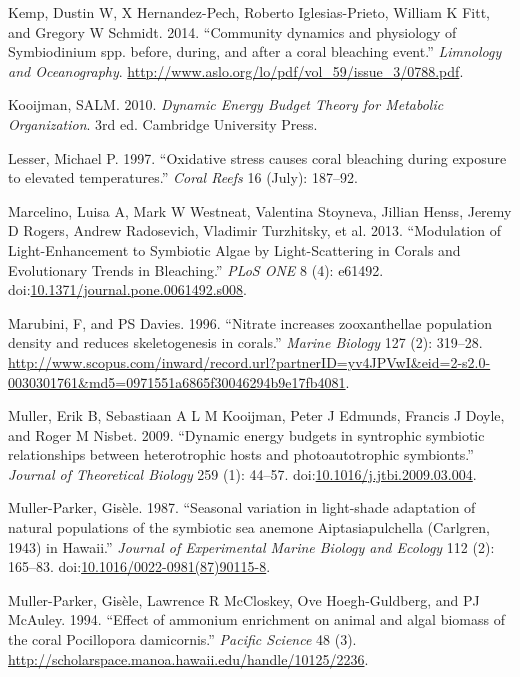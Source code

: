 \documentclass[]{elsarticle} %
\begin{document}
\hypertarget{ref-Kemp:2014ug}{}
Kemp, Dustin W, X Hernandez-Pech, Roberto Iglesias-Prieto, William K
Fitt, and Gregory W Schmidt. 2014. ``Community dynamics and physiology
of Symbiodinium spp. before, during, and after a coral bleaching
event.'' \emph{Limnology and Oceanography}.
\url{http://www.aslo.org/lo/pdf/vol_59/issue_3/0788.pdf}.

\hypertarget{ref-Kooijman:2010vd}{}
Kooijman, SALM. 2010. \emph{Dynamic Energy Budget Theory for Metabolic
Organization}. 3rd ed. Cambridge University Press.

\hypertarget{ref-Lesser:1997p3587}{}
Lesser, Michael P. 1997. ``Oxidative stress causes coral bleaching
during exposure to elevated temperatures.'' \emph{Coral Reefs} 16
(July): 187--92.

\hypertarget{ref-Marcelino:2013hz}{}
Marcelino, Luisa A, Mark W Westneat, Valentina Stoyneva, Jillian Henss,
Jeremy D Rogers, Andrew Radosevich, Vladimir Turzhitsky, et al. 2013.
``Modulation of Light-Enhancement to Symbiotic Algae by Light-Scattering
in Corals and Evolutionary Trends in Bleaching.'' \emph{PLoS ONE} 8 (4):
e61492.
doi:\href{https://doi.org/10.1371/journal.pone.0061492.s008}{10.1371/journal.pone.0061492.s008}.

\hypertarget{ref-Marubini:1996p8460}{}
Marubini, F, and PS Davies. 1996. ``Nitrate increases zooxanthellae
population density and reduces skeletogenesis in corals.'' \emph{Marine
Biology} 127 (2): 319--28.
\url{http://www.scopus.com/inward/record.url?partnerID=yv4JPVwI\&eid=2-s2.0-0030301761\&md5=0971551a6865f30046294b9e17fb4081}.

\hypertarget{ref-Muller:2009io}{}
Muller, Erik B, Sebastiaan A L M Kooijman, Peter J Edmunds, Francis J
Doyle, and Roger M Nisbet. 2009. ``Dynamic energy budgets in syntrophic
symbiotic relationships between heterotrophic hosts and photoautotrophic
symbionts.'' \emph{Journal of Theoretical Biology} 259 (1): 44--57.
doi:\href{https://doi.org/10.1016/j.jtbi.2009.03.004}{10.1016/j.jtbi.2009.03.004}.

\hypertarget{ref-MullerParker:1987cr}{}
Muller-Parker, Gisèle. 1987. ``Seasonal variation in light-shade
adaptation of natural populations of the symbiotic sea anemone
Aiptasiapulchella (Carlgren, 1943) in Hawaii.'' \emph{Journal of
Experimental Marine Biology and Ecology} 112 (2): 165--83.
doi:\href{https://doi.org/10.1016/0022-0981(87)90115-8}{10.1016/0022-0981(87)90115-8}.

\hypertarget{ref-MullerParker:1994uo}{}
Muller-Parker, Gisèle, Lawrence R McCloskey, Ove Hoegh-Guldberg, and PJ
McAuley. 1994. ``Effect of ammonium enrichment on animal and algal
biomass of the coral Pocillopora damicornis.'' \emph{Pacific Science} 48
(3). \url{http://scholarspace.manoa.hawaii.edu/handle/10125/2236}.
\end{document}
